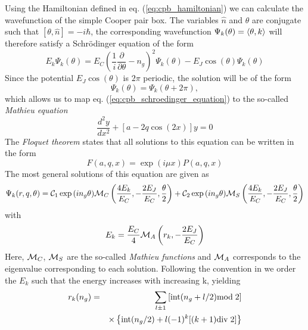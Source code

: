 Using the Hamiltonian defined in eq. (\ref{eq:cpb_hamiltonian}) we can calculate the wavefunction of the simple Cooper pair box. The variables $\hat{n}$ and $\theta$ are conjugate such that $[\theta,\hat{n}]=-i\hbar$, the corresponding wavefunction $\Psi_k(\theta) = \left< \theta,k \right>$ will therefore satisfy a Schrödinger equation of the form
%
\begin{equation}
E_k \Psi_k(\theta) = E_C(\frac{1}{i}\frac{\partial}{\partial \theta}-n_g)^2 \Psi_k(\theta) - E_J \cos{\left(\theta\right)}\Psi_k(\theta) \label{eq:cpb_schroedinger_equation}
\end{equation}
%
Since the potential $E_J\cos{(\theta)}$ is $2\pi$ periodic, the solution will be of the form
%
\begin{equation}
\Psi_k(\theta) = \Psi_k(\theta+2\pi),
\end{equation}
%
which allows us to map eq. (\ref{eq:cpb_schroedinger_equation}) to the so-called {\it Mathieu  equation}
%
\begin{equation}
\frac{d^2y}{dx^2}+\left[a-2q\cos{(2x)}\right]y = 0
\end{equation}
%
The {\it Floquet theorem} states that all solutions to this equation can be written in the form
%
\begin{equation}
F(a,q,x) = \exp{\left(i\mu x\right)}P(a,q,x)
\end{equation}
%
The most general solutions of this equation are given as \citep{cottet_implementation_2002}
%
\begin{equation}
\Psi_k(r,q,\theta) = \mcal{C}_1\exp{\left(i n_g \theta \right)}\mcal{M}_C\left(\frac{4E_k}{E_C},-\frac{2E_J}{E_C},\frac{\theta}{2}\right)+\mcal{C}_2\exp{\left(i n_g \theta \right)}\mcal{M}_S \left(\frac{4 E_k}{E_C},-\frac{2 E_J}{E_C},\frac{\theta}{2}\right)
\end{equation}
%
with 
%
\begin{equation}
E_k = \frac{E_C}{4}\mcal{M}_A \left(r_k,-\frac{2 E_J}{E_C} \right)
\end{equation}
%
Here, $\mcal{M}_C$, $\mcal{M}_S$ are the so-called {\it Mathieu functions} and $\mcal{M}_A$ corresponds to the eigenvalue corresponding to each solution. Following the convention in \citep{cottet_implementation_2002} we order the $E_k$ such that the energy increases with increasing k, yielding \citep{koch_charge-insensitive_2007}
%
\begin{eqnarray}
r_k(n_g) & = & \sum\limits_{l\pm 1}\left[\mathrm{int}(n_g+l/2)\mathrm{mod}\;2\right] \notag \\
&  & \times\left\{\mathrm{int}(n_g/2)+l(-1)^k[(k+1)\mathrm{div}\;2]\right\}
\end{eqnarray}
%

